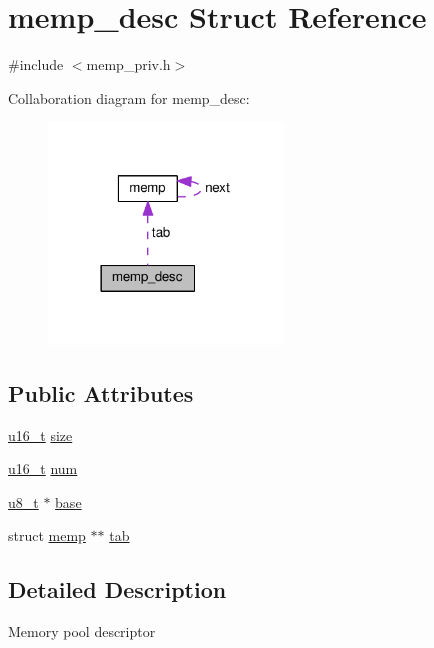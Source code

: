 \hypertarget{structmemp__desc}{}\section{memp\+\_\+desc Struct Reference}
\label{structmemp__desc}


{\ttfamily \#include $<$memp\+\_\+priv.\+h$>$}



Collaboration diagram for memp\+\_\+desc\+:
\nopagebreak
\begin{figure}[H]
\begin{center}
\leavevmode
\includegraphics[width=177pt]{structmemp__desc__coll__graph}
\end{center}
\end{figure}
\subsection*{Public Attributes}
\begin{DoxyCompactItemize}
\item 
\hyperlink{group__compiler__abstraction_ga77570ac4fcab86864fa1916e55676da2}{u16\+\_\+t} \hyperlink{structmemp__desc_a1688d2bdd5a7b77700e1fa627f025ba3}{size}
\item 
\hyperlink{group__compiler__abstraction_ga77570ac4fcab86864fa1916e55676da2}{u16\+\_\+t} \hyperlink{structmemp__desc_a2c32db78e565b8812ca0e20fe929a8a7}{num}
\item 
\hyperlink{group__compiler__abstraction_ga4caecabca98b43919dd11be1c0d4cd8e}{u8\+\_\+t} $\ast$ \hyperlink{structmemp__desc_a2201cfaa51bc8f0b567d6d46cf177624}{base}
\item 
struct \hyperlink{structmemp}{memp} $\ast$$\ast$ \hyperlink{structmemp__desc_a98a1016a663a74dd98e65daf84782399}{tab}
\end{DoxyCompactItemize}


\subsection{Detailed Description}
Memory pool descriptor 

